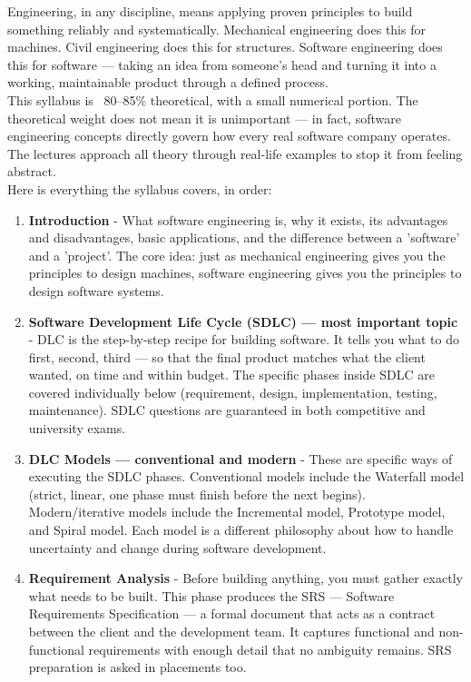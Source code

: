 \documentclass{report}
\begin{document}
Engineering, in any discipline, means applying proven principles to build something reliably and systematically. Mechanical engineering does this for machines. Civil engineering does this for structures. Software engineering does this for software — taking an idea from someone's head and turning it into a working, maintainable product through a defined process.\\This syllabus is ~80–85\% theoretical, with a small numerical portion. The theoretical weight does not mean it is unimportant — in fact, software engineering concepts directly govern how every real software company operates. The lectures approach all theory through real-life examples to stop it from feeling abstract.\\Here is everything the syllabus covers, in order:
\begin{enumerate}
    \item \textbf{Introduction} - What software engineering is, why it exists, its advantages and disadvantages, basic applications, and the difference between a 'software' and a 'project'. The core idea: just as mechanical engineering gives you the principles to design machines, software engineering gives you the principles to design software systems.
    \item \textbf{Software Development Life Cycle (SDLC) — most important topic} - DLC is the step-by-step recipe for building software. It tells you what to do first, second, third — so that the final product matches what the client wanted, on time and within budget. The specific phases inside SDLC are covered individually below (requirement, design, implementation, testing, maintenance). SDLC questions are guaranteed in both competitive and university exams.

    \item \textbf{DLC Models — conventional and modern} - These are specific ways of executing the SDLC phases. Conventional models include the Waterfall model (strict, linear, one phase must finish before the next begins). Modern/iterative models include the Incremental model, Prototype model, and Spiral model. Each model is a different philosophy about how to handle uncertainty and change during software development.

    \item \textbf{Requirement Analysis} - Before building anything, you must gather exactly what needs to be built. This phase produces the SRS — Software Requirements Specification — a formal document that acts as a contract between the client and the development team. It captures functional and non-functional requirements with enough detail that no ambiguity remains. SRS preparation is asked in placements too.


\end{enumerate}
\end{document}
